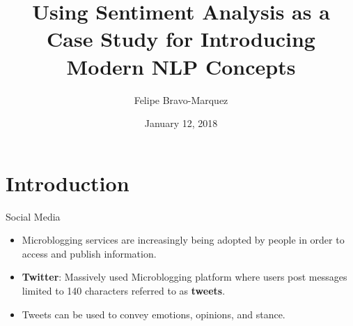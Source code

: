 \documentclass[handout]{beamer}
\title{Using Sentiment Analysis as a Case Study for Introducing Modern NLP Concepts}
\author[Felipe Bravo Márquez]{\footnotesize
 \textcolor[rgb]{0.00,0.00,1.00}{Felipe Bravo-Marquez}}
\institute{Department of Computer Science, University of Chile \\ IMDF }
\date{January 12, 2018}
\begin{document}
\begin{frame}
\titlepage


\end{frame}


\section{Introduction}





\begin{frame}{Social Media}
\begin{scriptsize}
\begin{itemize}
 \item Microblogging services are increasingly being adopted by people in order to access and publish information.  
 \item \textbf{Twitter}: Massively used Microblogging platform where users post messages limited to 140 characters referred to as \textbf{tweets}. 
 \item  Tweets can be used to convey  emotions,  opinions, and  stance.
\end{itemize}


\end{scriptsize}
\end{frame}
\end{document}
